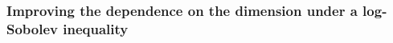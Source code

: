\documentclass{article}
\renewcommand{\leq}{\leqslant}
\begin{document}
%

\subsubsection{Improving the dependence on the dimension under a log-Sobolev inequality}
\label{sec:scaling_dimension_Langevin_improved}
\end{document}
